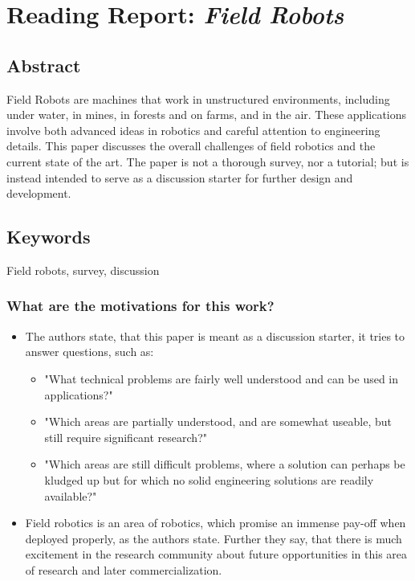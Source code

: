     \newpage
    \section{Reading Report: \emph{Field Robots}}
    \label{sec:Thorpe2001}
    \cite{Thorpe2001}
    
    \subsection*{Abstract}
    Field Robots are machines that work in unstructured environments, including
    under water, in mines, in forests and on farms, and in the air. These applications
    involve both advanced ideas in robotics and careful attention to engineering
    details. This paper discusses the overall challenges of field robotics and the
    current state of the art. The paper is not a thorough survey, nor a tutorial; but is
    instead intended to serve as a discussion starter for further design and
    development.
    
    \subsection*{Keywords}
    Field robots, survey, discussion
    
     
    \subsubsection*{What are the motivations for this work?}
    \begin{itemize}
        \item The authors state, that this paper is meant as a discussion starter, it tries to answer questions, such as: \ \begin{itemize}
            \item "What technical problems are fairly well understood and can be used in applications?"
            \item "Which areas are partially understood, and are somewhat useable, but still require significant research?"
            \item "Which areas are still difficult problems, where a solution can perhaps be kludged up but for which no solid engineering solutions are readily available?"
        \end{itemize}
        \item Field robotics is an area of robotics, which promise an immense pay-off when deployed properly, as the authors state. Further they say, that there is much excitement in the research community about future opportunities in this area of research and later commercialization.
    \end{itemize}
